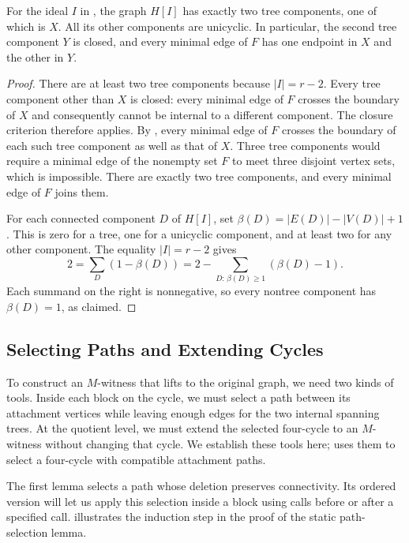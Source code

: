 \documentclass[USenglish, a4paper, thm-restate,numberwithinsect, cleveref]{lipics-v2021}
\begin{document}
\begin{corollary}
\label{cor:characterization-early-components}
For the ideal $I$ in , the graph
$H[I]$ has exactly two tree components, one of which is $X$.
All its other components are unicyclic. In particular, the second
tree component $Y$ is closed, and every minimal edge of $F$
has one endpoint in $X$ and the other in $Y$.
\end{corollary}
\begin{proof}
There are at least two tree components because $|I|=r-2$.
Every tree component other than $X$ is closed: every minimal
edge of $F$ crosses the boundary of $X$ and consequently cannot
be internal to a different component. The closure criterion
therefore applies. By , every
minimal edge of $F$ crosses the boundary of each such tree
component as well as that of $X$. Three tree components would
require a minimal edge of the nonempty set $F$ to meet three
disjoint vertex sets, which is impossible. There are exactly two
tree components, and every minimal edge of $F$ joins them.

For each connected component $D$ of $H[I]$, set
$\beta(D)=|E(D)|-|V(D)|+1$. This is zero for a tree, one for a
unicyclic component, and at least two for any other component.
The equality $|I|=r-2$ gives
\[
 2=\sum_D(1-\beta(D))
   =2-\sum_{D:\,\beta(D)\ge1}(\beta(D)-1).
\]
Each summand on the right is nonnegative, so every nontree
component has $\beta(D)=1$, as claimed.
\end{proof}


\subsection{Selecting Paths and Extending Cycles}
\label{sec:necessity-path-selection}
To construct an $M$-witness that lifts to the original graph, we need
two kinds of tools. Inside each block on the cycle, we must select a
path between its attachment vertices while leaving enough edges for
the two internal spanning trees. At the quotient level, we must
extend the selected four-cycle to an $M$-witness without changing
that cycle. We establish these tools here;
 uses them to select a four-cycle with
compatible attachment paths.

The first lemma selects a path whose deletion preserves connectivity.
Its ordered version will let us apply this selection inside a block
using calls before or after a specified call.
 illustrates the induction step in the proof
of the static path-selection lemma.
\end{document}
